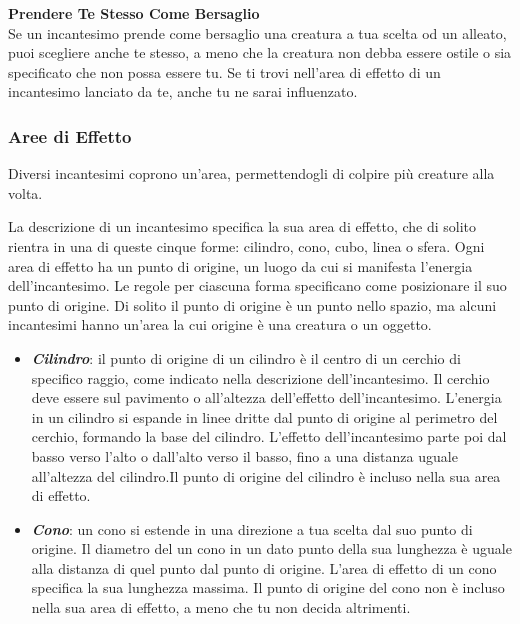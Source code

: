 \documentclass[12pt,a4paper,twoside,openany]{book}
\begin{document}
\begin{multicols}{2}
\textbf{Prendere Te Stesso Come Bersaglio}\\

Se un incantesimo prende come bersaglio una creatura a tua scelta od un alleato, puoi scegliere anche te stesso, a meno che la creatura non debba essere ostile o sia specificato che non possa essere tu. Se ti trovi nell'area di effetto di un incantesimo lanciato da te, anche tu ne sarai influenzato.

%

\subsubsection{Aree di Effetto}\label{magieareedieffetto}

Diversi incantesimi coprono un'area, permettendogli di colpire più creature alla volta.

La descrizione di un incantesimo specifica la sua area di effetto, che di solito rientra in una di queste cinque forme: cilindro, cono, cubo, linea o sfera. Ogni area di effetto ha un punto di origine, un luogo da cui si manifesta l'energia dell'incantesimo. Le regole per ciascuna forma specificano come posizionare il suo punto di origine. Di solito il punto di origine è un punto nello spazio, ma alcuni incantesimi hanno un'area la cui origine è una creatura o un oggetto.

\begin{itemize}
\item
\textit{\textbf{Cilindro}}: il punto di origine di un cilindro è il centro di un cerchio di specifico raggio, come indicato nella descrizione dell'incantesimo. Il cerchio deve essere sul pavimento o all'altezza dell'effetto dell'incantesimo. L'energia in un cilindro si espande in linee dritte dal punto di origine al perimetro del cerchio, formando la base del cilindro. L'effetto dell'incantesimo parte poi dal basso verso l'alto o dall'alto verso il basso, fino a una distanza uguale all'altezza del cilindro.Il punto di origine del cilindro è incluso nella sua area di effetto.
	
\item
\textit{\textbf{Cono}}: un cono si estende in una direzione a tua scelta dal suo punto di origine. Il diametro del un cono in un dato punto della sua lunghezza è uguale alla distanza di quel punto dal punto di origine. L'area di effetto di un cono specifica la sua lunghezza massima. Il punto di origine del cono non è incluso nella sua area di effetto, a meno che tu non decida altrimenti.
	

\end{itemize}
\end{multicols}
\end{document}
